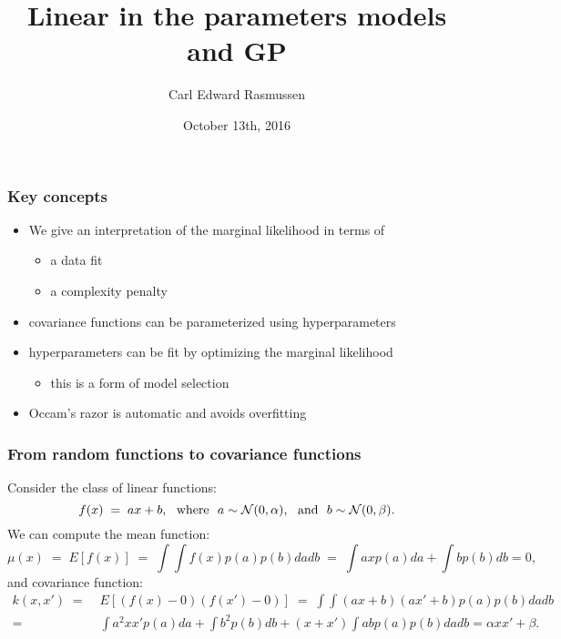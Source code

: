 

\title{Linear in the parameters models and GP}
\author{Carl Edward Rasmussen}
\date{October 13th, 2016}



\begin{frame}
\titlepage
\end{frame}

\begin{frame}
\frametitle{Key concepts}
\begin{itemize}
\item We give an interpretation of the marginal likelihood in terms of
\begin{itemize}
\item a data fit
\item a complexity penalty
\end{itemize}
\item covariance functions can be parameterized using hyperparameters
\item hyperparameters can be fit by optimizing the marginal likelihood
\begin{itemize}
\item this is a form of model selection
\end{itemize}
\item Occam's razor is automatic and avoids overfitting
\end{itemize}
\end{frame}

\begin{frame}
\frametitle{From random functions to covariance functions}

Consider the class of linear functions:
\[
f(x)\;=\;ax+b,\text{\ \ where\ \ }a\sim{\cal N}(0,\alpha),\text{\ \ and\ \ }
b\sim{\cal N}(0,\beta).
\]
We can compute the mean function:
\[
\mu(x)\;=\;E[f(x)]\;=\;\int\!\int f(x)p(a)p(b)dadb\;=\;
\int axp(a)da+\int bp(b)db=0,
\]
and covariance function:
\[
\begin{split}
k(x,x')\;=&\;E[(f(x)-0)(f(x')-0)]\;=\;\int\!\int
(ax+b)(ax'+b)p(a)p(b)dadb\\
=&\;\int a^2xx'p(a)da+\int b^2p(b)db+(x+x')\int abp(a)p(b)dadb
=\alpha xx'+\beta.
\end{split}
\]
\end{frame}


